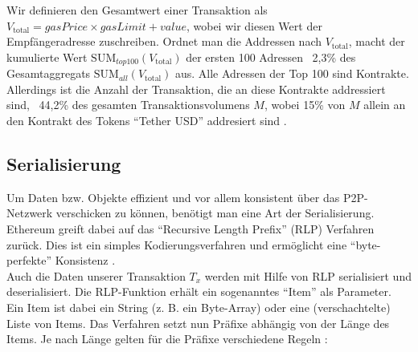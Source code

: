 \documentclass[runningheads]{llncs}
\begin{document}
Wir definieren den Gesamtwert einer Transaktion als $ V_{\text{total}} = \textit{gasPrice} \times \textit{gasLimit} + \textit{value} $, wobei wir diesen Wert der Empfängeradresse zuschreiben. Ordnet man die Addressen nach $ V_{\text{total}} $, macht der kumulierte Wert $ \text{SUM}_{top100}(V_{\text{total}}) $ der ersten 100 Adressen ~2,3\% des Gesamtaggregats $ \text{SUM}_{all}(V_{\text{total}}) $ aus. Alle Adressen der Top 100 sind Kontrakte. Allerdings ist die Anzahl der Transaktion, die an diese Kontrakte addressiert sind, ~44,2\% des gesamten Transaktionsvolumens $ M $, wobei 15\% von $ M $ allein an den Kontrakt des Tokens "`Tether USD"' addresiert sind \cite{neemann_appendix_nodate}. 

\subsection{Serialisierung}
Um Daten bzw. Objekte effizient und vor allem konsistent über das P2P-Netz\-werk verschicken zu können, benötigt man eine Art der Serialisierung. Ethereum greift dabei auf das "`Recursive Length Prefix"' (RLP) Verfahren zurück. Dies ist ein simples Kodierungsverfahren und ermöglicht eine "`byte-perfekte"' Konsistenz \cite{noauthor_ethereumwiki_nodate}.\\
Auch die Daten unserer Transaktion $T_x$ werden mit Hilfe von RLP serialisiert und deserialisiert.
Die RLP-Funktion erhält ein sogenanntes "`Item"' als Parameter. Ein Item ist dabei ein String (z. B. ein Byte-Array) oder eine (verschachtelte) Liste von Items. Das Verfahren setzt nun Präfixe abhängig von der Länge des Items. Je nach Länge gelten für die Präfixe verschiedene Regeln \cite{noauthor_ethereum/wiki/rlp_nodate}:
\end{document}
